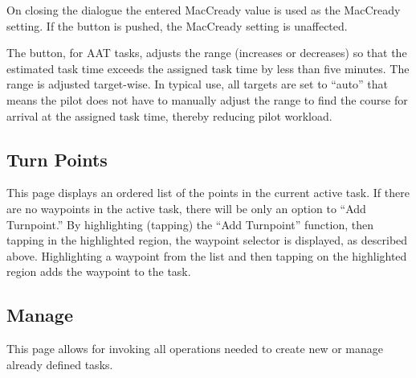 On closing the dialogue the entered MacCready value is used as the MacCready
setting. If the  button is pushed, the MacCready setting is
unaffected.

The  button, for AAT tasks, adjusts the range
(increases or decreases) so that the estimated task time exceeds the
assigned task time by less than five minutes.  The range is adjusted
target-wise. In typical use, all targets are set to ``auto'' that means the pilot
does not have to manually adjust the range to find the course for arrival at
the assigned task time, thereby reducing pilot workload.

\subsection*{Turn Points}
This page displays an ordered list of the points in the current active task.
If there are no waypoints in the active task, there
will be only an option to ``Add Turnpoint.''  By highlighting (tapping) the
``Add Turnpoint'' function, then tapping in the highlighted region, the waypoint
selector is displayed, as described above.  Highlighting a waypoint from the
list and then tapping on the highlighted region adds the waypoint to the task.

\subsection*{Manage}
This page allows for invoking all operations needed to create new or manage
already defined tasks.


